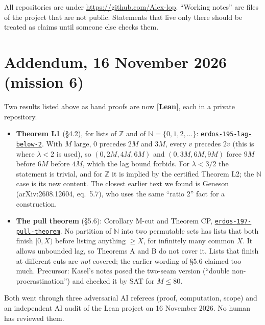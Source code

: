 \documentclass[11pt,letterpaper]{article}
\newcommand{\Z}{\mathbb{Z}}
\newcommand{\N}{\mathbb{N}}
\newcommand{\repo}[1]{\href{https://github.com/Alex-lop/#1}{\nolinkurl{#1}}}
\begin{document}
\noindent All repositories are under \url{https://github.com/Alex-lop}. ``Working notes'' are files of the
project that are not public. Statements that live only there should be treated as claims until someone else
checks them.

\section{Addendum, 16 November 2026 (mission 6)}
Two results listed above as hand proofs are now \textbf{[Lean]}, each in a private repository.
\begin{itemize}
\item \textbf{Theorem L1} (\S4.2), for lists of $\Z$ and of $\N=\{0,1,2,\dots\}$: \repo{erdos-195-lag-below-2}. With $M$
large, $0$ precedes $2M$ and $3M$, every $v$ precedes $2v$ (this is where $\lambda<2$ is used), so $(0,2M,4M,6M)$ and
$(0,3M,6M,9M)$ force $9M$ before $6M$ before $4M$, which the lag bound forbids. For $\lambda<3/2$ the statement is
trivial, and for $\Z$ it is implied by the certified Theorem L2; the $\N$ case is its new content. The closest earlier
text we found is Geneson (arXiv:2608.12604, eq.~5.7), who uses the same ``ratio 2'' fact for a construction.
\item \textbf{The pull theorem} (\S5.6): Corollary M-cut and Theorem CP, \repo{erdos-197-pull-theorem}. No partition
of $\N$ into two permutable sets has lists that both finish $[0,X)$ before listing anything $\ge X$, for infinitely
many common $X$. It allows unbounded lag, so Theorems A and B do not cover it. Lists that finish at different cuts
are \emph{not} covered; the earlier wording of \S5.6 claimed too much. Precursor: Kasel's notes posed the two-seam
version (``double non-procrastination'') and checked it by SAT for $M\le 80$.
\end{itemize}
Both went through three adversarial AI referees (proof, computation, scope) and an independent AI audit of the Lean
project on 16 November 2026. No human has reviewed them.

\end{document}
